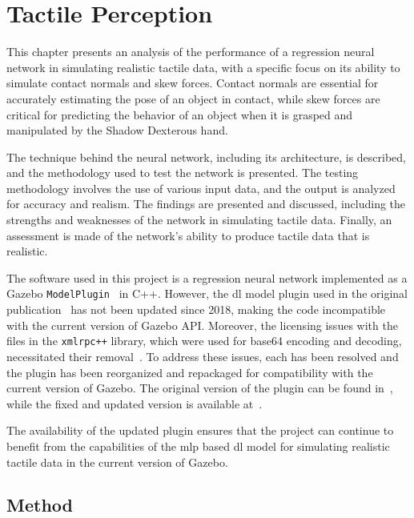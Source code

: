 \chapter{Tactile Perception} \label{ch:1-tactile-perception}

This chapter presents an analysis of the performance of a regression neural network in simulating realistic tactile data, with a specific focus on its ability to simulate contact normals and skew forces. Contact normals are essential for accurately estimating the pose of an object in contact, while skew forces are critical for predicting the behavior of an object when it is grasped and manipulated by the Shadow Dexterous hand. \medskip

The technique behind the neural network, including its architecture, is described, and the methodology used to test the network is presented. The testing methodology involves the use of various input data, and the output is analyzed for accuracy and realism. The findings are presented and discussed, including the strengths and weaknesses of the network in simulating tactile data. Finally, an assessment is made of the network's ability to produce tactile data that is realistic. \medskip

The software used in this project is a regression neural network implemented as a Gazebo \texttt{ModelPlugin}~\cite{gazebo-model-plugin} in C++. However, the \gls{dl} model plugin used in the original publication~\cite{simulation-of-the-syntouch-biotac-sensor} has not been updated since 2018, making the code incompatible with the current version of Gazebo API. Moreover, the licensing issues with the files in the \texttt{xmlrpc++} library, which were used for base64 encoding and decoding, necessitated their removal~\cite{base64-encoding-decoding-licensing-issue}. To address these issues, each has been resolved and the plugin has been reorganized and repackaged for compatibility with the current version of Gazebo. The original version of the plugin can be found in~\cite{ruppel-philipp-biotac-gazebo-plugin}, while the fixed and updated version is available at~\cite{melbye-staven-biotac-sim-plugin}. \medskip

The availability of the updated plugin ensures that the project can continue to benefit from the capabilities of the \gls{mlp} based \gls{dl} model for simulating realistic tactile data in the current version of Gazebo.


\section{Method}\label{sec:1-tactile-perception-method}

